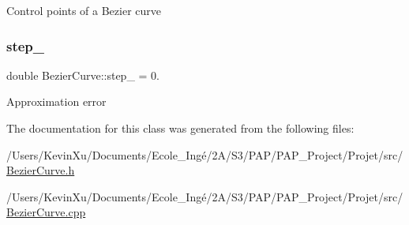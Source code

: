 Control points of a Bezier curve \mbox{\label{class_bezier_curve_a308d7d0afc02da11ed0020508d537818}} 
\subsubsection{\texorpdfstring{step\+\_\+}{step\_}}
{\footnotesize\ttfamily double Bezier\+Curve\+::step\+\_\+ = 0.\hspace{0.3cm}{\ttfamily [private]}}

Approximation error 

The documentation for this class was generated from the following files\+:\begin{DoxyCompactItemize}
\item 
/\+Users/\+Kevin\+Xu/\+Documents/\+Ecole\+\_\+\+Ingé/2\+A/\+S3/\+P\+A\+P/\+P\+A\+P\+\_\+\+Project/\+Projet/src/\mbox{\hyperlink{_bezier_curve_8h}{Bezier\+Curve.\+h}}\item 
/\+Users/\+Kevin\+Xu/\+Documents/\+Ecole\+\_\+\+Ingé/2\+A/\+S3/\+P\+A\+P/\+P\+A\+P\+\_\+\+Project/\+Projet/src/\mbox{\hyperlink{_bezier_curve_8cpp}{Bezier\+Curve.\+cpp}}\end{DoxyCompactItemize}
